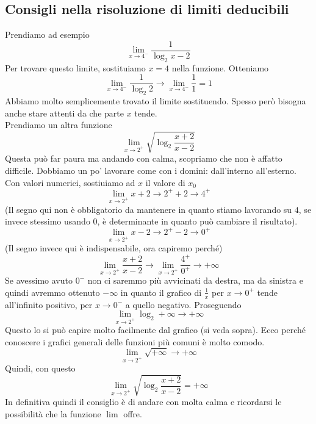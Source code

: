 \subsection{Consigli nella risoluzione di limiti deducibili}
Prendiamo ad esempio
\begin{equation*}
  \lim\limits_{x\to4^-}\frac{1}{\log_2 x -2}
\end{equation*}
Per trovare questo limite, sostituiamo $x = 4$ nella funzione. Otteniamo
\begin{equation*}
  \lim\limits_{x\to4^-}\frac{1}{\log_2 2} \to \lim\limits_{x\to4^-}\frac{1}{1} = 1
\end{equation*}
Abbiamo molto semplicemente trovato il limite sostituendo. Spesso però bisogna anche stare attenti 
da che parte $x$ tende.\\[\baselineskip]
Prendiamo un altra funzione
\begin{equation*}
  \lim\limits_{x\to2^+}\sqrt{\log_2\frac{x+2}{x-2}}
\end{equation*}
Questa può far paura ma andando con calma, scopriamo che non è affatto difficile. Dobbiamo un po'
lavorare come con i domini: dall'interno all'esterno. Con valori numerici, sostiuiamo ad $x$ il valore
di $x_0$
\begin{equation*}
  \lim\limits_{x\to2^+}x+2 \to 2^++2 \to 4^+
\end{equation*}
(Il segno qui non è obbligatorio da mantenere in quanto stiamo lavorando su $4$, se invece stessimo
usando $0$, è determinante in quanto può cambiare il risultato).
\begin{equation*}
  \lim\limits_{x\to2^+}x-2 \to 2^+-2 \to 0^+
\end{equation*}
(Il segno invece qui è indispensabile, ora capiremo perché)
\begin{equation*}
  \lim\limits_{x\to2^+}\frac{x+2}{x-2}\to\lim\limits_{x\to2^+}\frac{4^+}{0^+}\to+\infty
\end{equation*}
Se avessimo avuto $0^-$ non ci saremmo più avvicinati da destra, ma da sinistra e quindi avremmo 
ottenuto $-\infty$ in quanto il grafico di $\frac{1}{x}$ per $x\to 0^+$ tende all'infinito positivo,
per $x\to0^-$ a quello negativo. Proseguendo
\begin{equation*}
  \lim\limits_{x\to2^+}\log_2 +\infty \to +\infty
\end{equation*}
Questo lo si può capire molto facilmente dal grafico (si veda sopra). Ecco perché conoscere i grafici
generali delle funzioni più comuni è molto comodo.
\begin{equation*}
  \lim\limits_{x\to2^+}\sqrt{+\infty}\to+\infty
\end{equation*}
Quindi, con questo
\begin{equation*}
  \lim\limits_{x\to2^+}\sqrt{\log_2\frac{x+2}{x-2}} = +\infty
\end{equation*}
In definitiva quindi il consiglio è di andare con molta calma e ricordarsi le possibilità che la
funzione $\lim$ offre.

